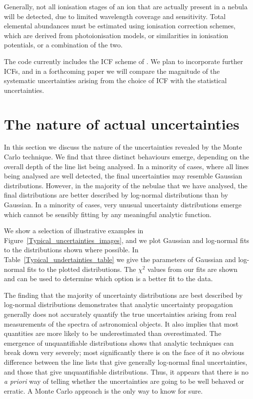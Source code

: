 \documentclass[useAMS,usenatbib]{mn2e}
\begin{document}
Generally, not all ionisation stages of an ion that are actually present in a nebula will be detected, due to limited wavelength coverage and sensitivity.  Total elemental abundances must be estimated using ionisation correction schemes, which are derived from photoionisation models, or similarities in ionisation potentials, or a combination of the two.

The code currently includes the ICF scheme of \citet{1994MNRAS.271..257K}.  We plan to incorporate further ICFs, and in a forthcoming paper we will compare the magnitude of the systematic uncertainties arising from the choice of ICF with the statistical uncertainties.

\section{The nature of actual uncertainties}

In this section we discuss the nature of the uncertainties revealed by the Monte Carlo technique.  We find that three distinct behaviours emerge, depending on the overall depth of the line list being analysed.  In a minority of cases, where all lines being analysed are well detected, the final uncertainties may resemble Gaussian distributions.  However, in the majority of the nebulae that we have analysed, the final distributions are better described by log-normal distributions than by Gaussian.  In a minority of cases, very unusual uncertainty distributions emerge which cannot be sensibly fitting by any meaningful analytic function.

We show a selection of illustrative examples in Figure~\ref{Typical_uncertainties_images}, and we plot Gaussian and log-normal fits to the distributions shown where possible.  In Table~\ref{Typical_undertainties_table} we give the parameters of Gaussian and log-normal fits to the plotted distributions.  The $\chi^2$ values from our fits are shown and can be used to determine which option is a better fit to the data.

The finding that the majority of uncertainty distributions are best described by log-normal distributions demonstrates that analytic uncertainty propagation generally does not accurately quantify the true uncertainties arising from real measurements of the spectra of astronomical objects.  It also implies that most quantities are more likely to be underestimated than overestimated.  The emergence of unquantifiable distributions shows that analytic techniques can break down very severely; most significantly there is on the face of it no obvious difference between the line lists that give generally log-normal final uncertainties, and those that give unquantifiable distributions.  Thus, it appears that there is no {\it a priori} way of telling whether the uncertainties are going to be well behaved or erratic.  A Monte Carlo approach is the only way to know for sure.
\end{document}
